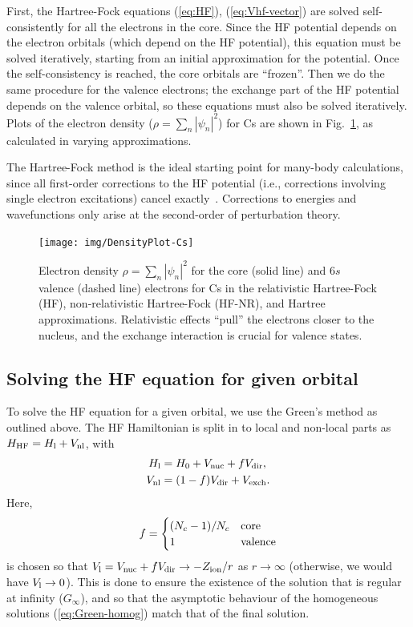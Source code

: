 \documentclass[10pt,twocolumn,a4paper]{article}%
\newcommand{\be}{\begin{equation}}
\newcommand{\ee}{\end{equation}}
\begin{document}
First, the Hartree-Fock equations (\ref{eq:HF}), (\ref{eq:Vhf-vector}) are solved self-consistently for all the electrons in the core.
Since the HF potential depends on the electron orbitals (which depend on the HF potential), this equation must be solved iteratively, starting from an initial approximation for the potential.
Once the self-consistency is reached, the core orbitals are ``frozen''.
Then we do the same procedure for the valence electrons; the exchange part of the HF potential depends on the valence orbital, so these equations must also be solved iteratively.
Plots of the electron density ($\rho = \sum_n|\psi_n|^2$) for Cs are shown in Fig.~\ref{fig:ElectronDensity}, as calculated in varying approximations.



The Hartree-Fock method is the ideal starting point for many-body calculations, since all first-order corrections to the HF potential (i.e., corrections involving single electron excitations) cancel exactly~\cite{Lindgren1986}.
Corrections to energies and wavefunctions only arise at the second-order of perturbation theory.


\begin{figure}
\centering
\texttt{[image: img/DensityPlot-Cs]}
\caption{\small Electron density $\rho = \sum_n|\psi_n|^2$ for the core (solid line) and $6s$ valence (dashed line) electrons for Cs in the relativistic Hartree-Fock (HF), non-relativistic Hartree-Fock (HF-NR), and Hartree approximations. Relativistic effects ``pull'' the electrons closer to the nucleus, and the exchange interaction is crucial for valence states.\label{fig:ElectronDensity}}
\end{figure}






\subsection{Solving the HF equation for given orbital}\label{sec:hf-orbital}

To solve the HF equation for a given orbital, we use the Green's method as outlined above.
The HF Hamiltonian is split in to local and non-local parts as $H_{\rm HF} = H_{\rm l}+V_{\rm nl}$, with
\begin{align}
H_{\rm l} &= H_0 + V_{\rm nuc}+fV_{\rm dir},\\
V_{\rm nl} &= (1-f)V_{\rm dir}+V_{\rm exch}.
\end{align}
Here,
\be
f=
\begin{cases}
(N_c - 1)/N_c & {\rm core} \\
 1 & {\rm valence}
\end{cases}
\ee
is chosen so that $V_{\rm l} = V_{\rm nuc} +f V_{\rm dir}\to -Z_{\rm ion}/r$ as $r\to\infty$ (otherwise, we would have $V_{\rm l}\to0$).
This is done to ensure the existence of the solution that is regular at infinity ($G_\infty$), and so that the asymptotic behaviour of the homogeneous solutions (\ref{eq:Green-homog})  match that of the final solution.
\end{document}
